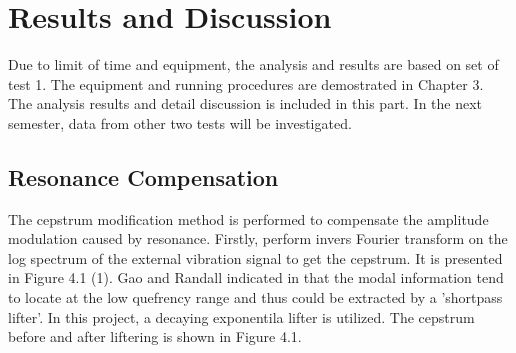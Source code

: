 \chapter{Results and Discussion}\label{ch:results}

Due to limit of time and equipment, the analysis and results are based on set of test 1. The equipment and running procedures are demostrated in Chapter 3. The analysis results and detail discussion is included in this part. In the next semester, data from other two tests will be investigated.

\section{Resonance Compensation}

The cepstrum modification method is performed to compensate the amplitude modulation caused by resonance. Firstly, perform invers Fourier transform on the log spectrum of the external vibration signal to get the cepstrum. It is presented in Figure 4.1 (1). Gao and Randall indicated in \cite{Gao1} \cite{Gao2} that the modal information tend to locate at the low quefrency range and thus could be extracted by a 'shortpass lifter'. In this project, a decaying exponentila lifter is utilized. The cepstrum before and after liftering is shown in Figure 4.1.


